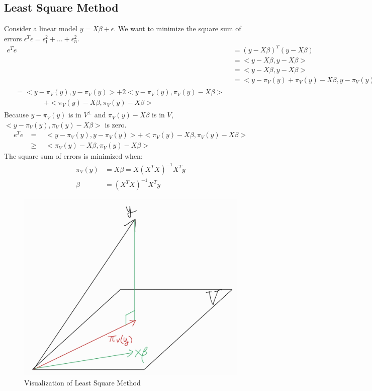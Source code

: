 \documentclass{article}
\begin{document}
\subsection{Least Square Method}
Consider a linear model \(y=X\beta +\epsilon\).
We want to minimize the square sum of errors \(\epsilon^T\epsilon=\epsilon_1^2+\dots+\epsilon_n^2\).
\begin{align*}
e^Te &= (y-X\beta)^T(y-X\beta) \\
&= <y-X\beta, y-X\beta> \\
&= <y-X\beta,y-X\beta> \\
&= <y-\pi_V(y)+\pi_V(y)-X\beta,y-\pi_V(y)+\pi_V(y)-X\beta>\\
\begin{split}
&= <y-\pi_V(y),y-\pi_V(y)> + 2<y-\pi_V(y),\pi_V(y)-X\beta>\\
&\qquad \qquad+<\pi_V(y)-X\beta,\pi_V(y)-X\beta>
\end{split}
\end{align*}
Because \(y-\pi_V(y)\) is in \(V^\perp\) and \(\pi_V(y)-X\beta\) is in \(V\), \(<y-\pi_V(y),\pi_V(y)-X\beta>\) is zero.
\begin{align*}
e^Te &=\quad<y-\pi_V(y),y-\pi_V(y)>+<\pi_V(y)-X\beta,\pi_V(y)-X\beta>\\
&\geq\quad <\pi_V(y)-X\beta,\pi_V(y)-X\beta>
\end{align*}
The square sum of errors is minimized when:
\begin{align*}
\pi_V(y)&=X\beta=X(X^TX)^{-1}X^Ty\\
\beta &= (X^TX)^{-1}X^Ty
\end{align*}
\begin{figure}[hb]
\centering
\includegraphics[scale=0.2]{fig_1.jpg}
\caption{Visualization of Least Square Method}
\end{figure}
\end{document}
